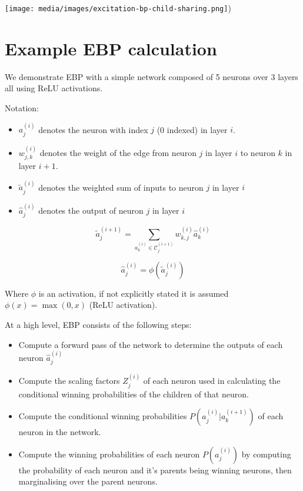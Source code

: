 \documentclass[A4paper,draft]{scrreprt}
\providecommand{\tightlist}{%
  \setlength{\itemsep}{0pt}\setlength{\parskip}{0pt}}
\newcommand{\neuron}[2]{a_{#2}^{(#1)}}
\newcommand{\neuronforward}[2]{\hat{a}_{#2}^{(#1)}}
\newcommand{\ebpscalar}[2]{Z_{#2}^{(#1)}}
\newcommand{\weight}[3]{w_{#2,#3}^{(#1)}}
\newcommand{\children}[2]{\mathscr{C}^{(#1)}_{#2}}
\newcommand{\cwp}[4]{P\left(\neuron{#1}{#2} | \neuron{#3}{#4}\right)}
\newcommand{\mwp}[2]{P\left(\neuron{#1}{#2}\right)}
\newcommand{\neuroninput}[2]{\tilde{a}^{(#1)}_{#2}}
\newcommand{\neuronoutput}[2]{\hat{a}^{(#1)}_{#2}}
\begin{document}
\texttt{[image: media/images/excitation-bp-child-sharing.png]})

\section{Example EBP calculation}\label{example-ebp-calculation}

We demonstrate EBP with a simple network composed of 5 neurons over 3
layers all using ReLU activations.

Notation:

\begin{itemize}
\tightlist
\item
  \(\neuron{i}{j}\) denotes the neuron with index \(j\) (0 indexed) in
  layer \(i\).
\item
  \(\weight{i}{j}{k}\) denotes the weight of the edge from neuron \(j\)
  in layer \(i\) to neuron \(k\) in layer \(i + 1\).
\item
  \(\neuroninput{i}{j}\) denotes the weighted sum of inputs to neuron
  \(j\) in layer \(i\)
\item
  \(\neuronoutput{i}{j}\) denotes the output of neuron \(j\) in layer
  \(i\)
\end{itemize}

\begin{equation}
\label{eq:neuron-input}
\neuroninput{i + 1}{j} = \sum_{a_{k}^{(i)} \in \children{i + 1}{j}} \weight{i}{k}{j} \neuronoutput{i}{k}
\end{equation}

\begin{equation}
\label{eq:neuron-output}
\neuronoutput{i}{j} = \phi(\neuroninput{i}{j})
\end{equation}

Where \(\phi\) is an activation, if not explicitly stated it is assumed
\(\phi(x) = \max(0, x)\) (ReLU activation).

At a high level, EBP consists of the following steps:

\begin{itemize}
\tightlist
\item
  Compute a forward pass of the network to determine the outputs of each
  neuron \(\neuronforward{i}{j}\)
\item
  Compute the scaling factors \(\ebpscalar{i}{j}\) of each neuron used
  in calculating the conditional winning probabilities of the children
  of that neuron.
\item
  Compute the conditional winning probabilities \(\cwp{i}{j}{i + 1}{k}\)
  of each neuron in the network.
\item
  Compute the winning probabilities of each neuron \(\mwp{i}{j}\) by
  computing the probability of each neuron and it's parents being
  winning neurons, then marginalising over the parent neurons.
\end{itemize}
\end{document}
